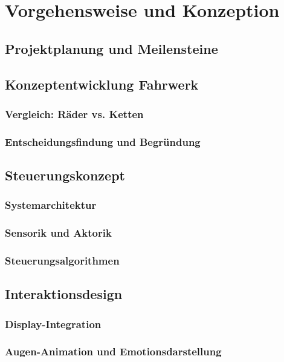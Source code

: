 \chapter{Vorgehensweise und Konzeption}
\label{cha:vorgehen}

\section{Projektplanung und Meilensteine}

\section{Konzeptentwicklung Fahrwerk}
\subsection{Vergleich: Räder vs. Ketten}
\subsection{Entscheidungsfindung und Begründung}




\section{Steuerungskonzept}
\subsection{Systemarchitektur}
\subsection{Sensorik und Aktorik}
\subsection{Steuerungsalgorithmen}


\section{Interaktionsdesign}
\subsection{Display-Integration}
\subsection{Augen-Animation und Emotionsdarstellung}
